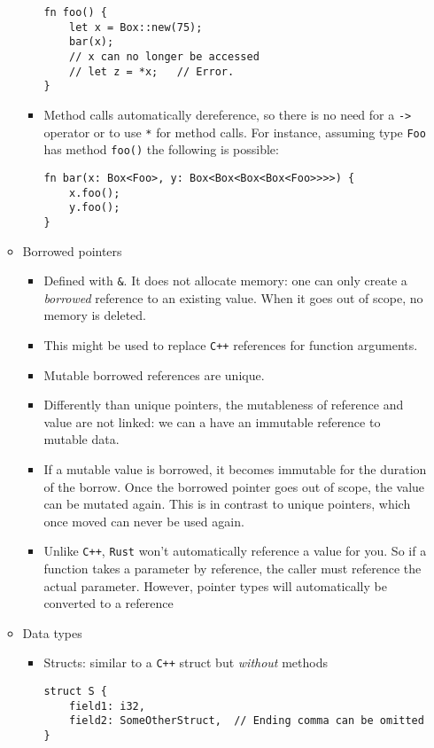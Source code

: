 \documentclass[a4paper,12pt,%
              final%
              ]{article}
\begin{document}
\begin{itemize}
\begin{itemize}
\begin{itemize}
\begin{verbatim}
fn foo() {
    let x = Box::new(75);
    bar(x);
    // x can no longer be accessed
    // let z = *x;   // Error.
}
\end{verbatim}
          \item Method calls automatically dereference, so there is no need for a \texttt{->} operator or to use \texttt{*} for method calls. For instance, assuming type \texttt{Foo} has method \texttt{foo()} the following is possible:
\begin{verbatim}
fn bar(x: Box<Foo>, y: Box<Box<Box<Box<Foo>>>>) {
    x.foo();
    y.foo();
}
\end{verbatim}
        \end{itemize}
      \item Borrowed pointers
        \begin{itemize}
          \item Defined with \verb|&|.
            It does not allocate memory: one can only create a \emph{borrowed} reference to an existing value.
            When it goes out of scope, no memory is deleted.
          \item This might be used to replace \texttt{C++} references for function arguments.
          \item Mutable borrowed references are unique.
          \item Differently than unique pointers, the mutableness of reference and value are not linked: we can a have an immutable reference to mutable data.
          \item If a mutable value is borrowed, it becomes immutable for the duration of the borrow. Once the borrowed pointer goes out of scope, the value can be mutated again. This is in contrast to unique pointers, which once moved can never be used again.
          \item Unlike \texttt{C++}, \texttt{Rust} won't automatically reference a value for you. So if a function takes a parameter by reference, the caller must reference the actual parameter. However, pointer types will automatically be converted to a reference
        \end{itemize}
      \item Data types
        \begin{itemize}
          \item Structs: similar to a \texttt{C++} struct but \emph{without} methods
\begin{verbatim}
struct S {
    field1: i32,
    field2: SomeOtherStruct,  // Ending comma can be omitted
}
\end{verbatim}
        \end{itemize}
    \end{itemize}
\end{itemize}
\end{document}
